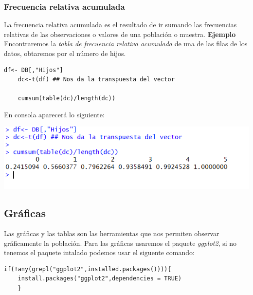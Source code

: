 \documentclass[12pt,hidelinks]{article}
\begin{document}
	\subsubsection{Frecuencia relativa acumulada}
	La frecuencia relativa acumulada es el resultado de ir sumando las frecuencias relativas de las observaciones o valores de una población o muestra. \textbf{Ejemplo} Encontraremos la \textit{tabla de frecuencia relativa acumulada} de una de las filas de los datos, obtaremos por el número de hijos.
	\begin{lstlisting}[frame=single]
	df<- DB[,"Hijos"]
	dc<-t(df) ## Nos da la transpuesta del vector
	
	cumsum(table(dc)/length(dc))
	\end{lstlisting}
	En consola aparecerá lo siguiente:
	\begin{center}
		\includegraphics[width=\linewidth]{images/2/TFrelativaAcum.PNG}
	\end{center}
	\newpage
	\subsection{Gráficas}
	Las gráficas y las tablas son las herramientas que nos permiten observar gráficamente la población. Para las gráficas usaremos el paquete \textit{ggplot2}, si no tenemos el paquete intalado podemos usar el siguente comando:
	\begin{lstlisting}[frame=single]
	if(!any(grepl("ggplot2",installed.packages()))){
	install.packages("ggplot2",dependencies = TRUE)
	}
	\end{lstlisting}
\end{document}
